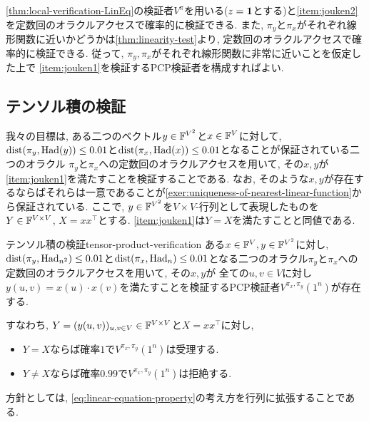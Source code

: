   \cref{thm:local-verification-LinEq}の検証者$V^\pi$を用いる($z=\mathbf{1}$とする)と\ref{item:jouken2}を定数回のオラクルアクセスで確率的に検証できる.
  また, $\pi_y$と$\pi_x$がそれぞれ線形関数に近いかどうかは\cref{thm:linearity-test}より, 定数回のオラクルアクセスで確率的に検証できる.
  従って, $\pi_y,\pi_x$がそれぞれ線形関数に非常に近いことを仮定した上で
  \ref{item:jouken1}を検証するPCP検証者を構成すればよい.

  \subsection{テンソル積の検証}
  我々の目標は, 
  ある二つのベクトル$y\in\mathbb{F}^{V^2}$と$x\in\mathbb{F}^V$に対して, $\mathrm{dist}(\pi_y,\mathrm{Had}(y))\le 0.01$と$\mathrm{dist}(\pi_x,\mathrm{Had}(x))\le 0.01$となることが保証されている二つのオラクル
  $\pi_y$と$\pi_x$への定数回のオラクルアクセスを用いて, その$x,y$が
  \ref{item:jouken1}を満たすことを検証することである.
  なお, そのような$x,y$が存在するならばそれらは一意であることが\cref{exer:uniqueness-of-nearest-linear-function}から保証されている.
  ここで, $y\in\mathbb{F}^{V^2}$を$V\times V$-行列として表現したものを$Y\in\mathbb{F}^{V\times V}$, $X=xx^\top$とする. \ref{item:jouken1}は$Y=X$を満たすことと同値である.

  \begin{lemma}{テンソル積の検証}{tensor-product-verification}
    ある$x\in\mathbb{F}^V,y\in\mathbb{F}^{V^2}$に対し, $\mathrm{dist}(\pi_y,\mathrm{Had}_{n^2})\le 0.01$と$\mathrm{dist}(\pi_x,\mathrm{Had}_n)\le 0.01$となる二つのオラクル$\pi_y$と$\pi_x$への定数回のオラクルアクセスを用いて, その$x,y$が
    全ての$u,v\in V$に対し$y(u,v)=x(u)\cdot x(v)$を満たすことを検証するPCP検証者$V^{\pi_x,\pi_y}(1^n)$が存在する.

    すなわち, $Y=(y(u,v))_{u,v\in V}\in\mathbb{F}^{V\times V}$と$X=xx^\top$に対し,
    \begin{itemize}
      \item $Y=X$ならば確率$1$で$V^{\pi_x,\pi_y}(1^n)$は受理する.
      \item $Y\ne X$ならば確率$0.99$で$V^{\pi_x,\pi_y}(1^n)$は拒絶する.
    \end{itemize}
  \end{lemma}
    
  方針としては, \cref{eq:linear-equation-property}の考え方を行列に拡張することである.
  
